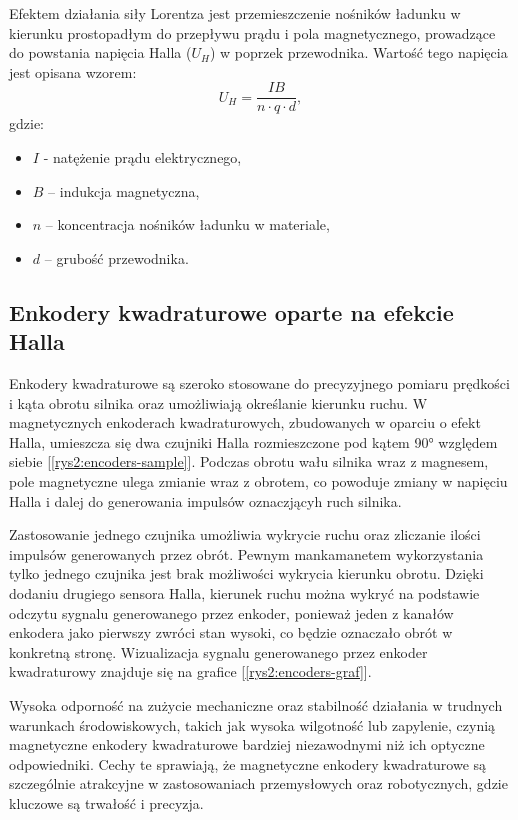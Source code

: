 Efektem działania siły Lorentza jest przemieszczenie nośników ładunku w kierunku prostopadłym do przepływu prądu i pola magnetycznego, prowadzące do powstania napięcia Halla (\( U_H \)) w poprzek przewodnika. Wartość tego napięcia jest opisana wzorem:
\[
U_H = \frac{I B}{n \cdot q \cdot d},
\]
gdzie:
\begin{itemize}
    \item \( I \) - natężenie prądu elektrycznego,
    \item \( B \) – indukcja magnetyczna,
    \item \( n \) – koncentracja nośników ładunku w materiale,
    \item \( d \) – grubość przewodnika.
\end{itemize}

\subsection{Enkodery kwadraturowe oparte na efekcie Halla}

Enkodery kwadraturowe są szeroko stosowane do precyzyjnego pomiaru prędkości i kąta obrotu silnika oraz umożliwiają określanie kierunku ruchu. W magnetycznych enkoderach kwadraturowych, zbudowanych w oparciu o efekt Halla, umieszcza się dwa czujniki Halla rozmieszczone pod kątem 90° względem siebie [\ref{rys2:encoders-sample}]. Podczas obrotu wału silnika wraz z magnesem, pole magnetyczne ulega zmianie wraz z obrotem, co powoduje zmiany w napięciu Halla i dalej do generowania impulsów oznaczjącyh ruch silnika. 

Zastosowanie jednego czujnika umożliwia wykrycie ruchu oraz zliczanie ilości impulsów generowanych przez obrót. Pewnym mankamanetem wykorzystania tylko jednego czujnika jest brak możliwości wykrycia kierunku obrotu. Dzięki dodaniu drugiego sensora Halla, kierunek ruchu można wykryć na podstawie odczytu sygnalu generowanego przez enkoder, ponieważ jeden z kanałów enkodera jako pierwszy zwróci stan wysoki, co będzie oznaczało obrót w konkretną stronę. Wizualizacja sygnalu generowanego przez enkoder kwadraturowy znajduje się na grafice [\ref{rys2:encoders-graf}].

Wysoka odporność na zużycie mechaniczne oraz stabilność działania w trudnych warunkach środowiskowych, takich jak wysoka wilgotność lub zapylenie, czynią magnetyczne enkodery kwadraturowe bardziej niezawodnymi niż ich optyczne odpowiedniki. Cechy te sprawiają, że magnetyczne enkodery kwadraturowe są szczególnie atrakcyjne w zastosowaniach przemysłowych oraz robotycznych, gdzie kluczowe są trwałość i precyzja.

